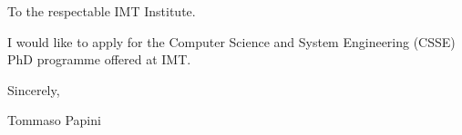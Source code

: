 \documentclass{article}
\begin{document}
    \hspace*{0.5\linewidth}
    
    To the respectable IMT Institute. \par \bigskip
    
    I would like to apply for the Computer Science and System
    Engineering (CSSE) PhD programme offered at IMT. \par \bigskip
    
    Sincerely, \par \medskip
    
    \qquad \qquad Tommaso Papini
\end{document}
